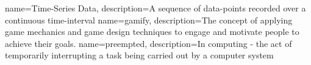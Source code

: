  {
  name=Time-Series Data, description={A sequence of data-points recorded over a
  continuous time-interval}
}
 {
  name=gamify, description={The concept of applying game mechanics and game design techniques to engage and motivate people to achieve their goals.}
}
 {
  name=preempted, description={In computing - the act of temporarily interrupting a task being carried out by a computer system}
}
